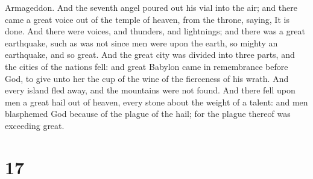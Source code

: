 Armageddon.  And the seventh angel poured out his vial
into the air; and there came a great voice out of the temple of heaven,
from the throne, saying, It is done.  And there were
voices, and thunders, and lightnings; and there was a great earthquake,
such as was not since men were upon the earth, so mighty an earthquake,
and so great.  And the great city was divided into three
parts, and the cities of the nations fell: and great Babylon came in
remembrance before God, to give unto her the cup of the wine of the
fierceness of his wrath.  And every island fled away, and
the mountains were not found.  And there fell upon men a
great hail out of heaven, every stone about the weight of a talent: and
men blasphemed God because of the plague of the hail; for the plague
thereof was exceeding great.

\hypertarget{section-16}{%
\section{17}\label{section-16}}

